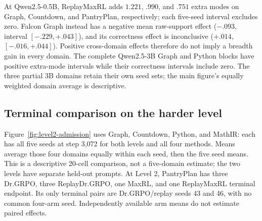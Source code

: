\begin{table}[H]
  \centering
  \caption{\textbf{ReplayMaxRL effects across model scales at pass 8.}
  All effects are ReplayMaxRL minus MaxRL on the displayed paired seeds.
  Brackets give paired Student-$t$ intervals for $\Delta B$ in complete blocks.
  The machine-readable report also retains both arm means, all per-seed
  effects, and intervals for $P$ and $D$.}
  \label{tab:current-e118}
  \scriptsize
  \setlength{\tabcolsep}{3pt}
\end{table}


At Qwen2.5-0.5B, ReplayMaxRL adds $1.221$, $.990$, and $.751$ extra modes
on Graph, Countdown, and PantryPlan, respectively; each five-seed interval
excludes zero. Falcon Graph instead has a negative mean raw-support effect
($-.093$, interval $[-.229,+.043]$), and its correctness effect is inconclusive
($+.014$, $[-.016,+.044]$). Positive cross-domain effects therefore do not
imply a breadth gain in every domain. The complete Qwen2.5-3B Graph and Python
blocks have positive extra-mode intervals while their correctness intervals
include zero. The three partial 3B domains retain their own seed sets;
the main figure's equally weighted domain average is descriptive.

\subsection{Terminal comparison on the harder level}
\label{app:level2-interim}

Figure~\ref{fig:level2-admission} uses Graph, Countdown, Python, and MathIR:
each has all five seeds at step 3,072 for both levels and all four methods.
Means average those four domains equally within each seed, then the five
seed means. This is a descriptive 20-cell comparison, not a five-domain
estimate; the two levels have separate held-out prompts. At Level 2,
PantryPlan has three Dr.GRPO, three ReplayDr.GRPO, one MaxRL, and one
ReplayMaxRL terminal endpoint. Its only terminal pairs are Dr.GRPO/replay
seeds 43 and 46, with no common four-arm seed. Independently available
arm means do not estimate paired effects.

